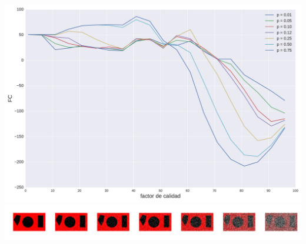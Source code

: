 \documentclass{beamer}
\begin{document}
\begin{frame}
    \begin{center}
        \includegraphics[scale=0.2]{fig/formas_SP_plot.pdf} \\
        \vspace{3mm}
        \includegraphics[scale=0.2]{fig/formas_SP_images.pdf}
    \end{center}
\end{frame}

\begin{frame}
\end{frame}
\end{document}
